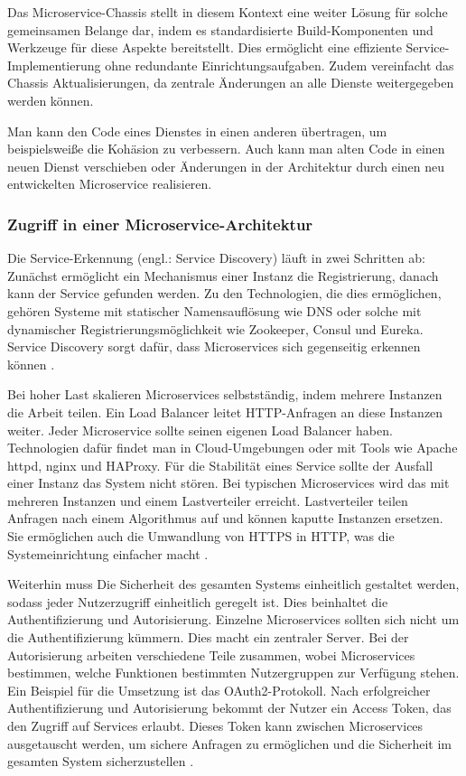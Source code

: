 {%
Das Microservice-Chassis stellt in diesem Kontext eine weiter Lösung für solche gemeinsamen Belange dar, indem es standardisierte Build-Komponenten und Werkzeuge für diese Aspekte bereitstellt. Dies ermöglicht eine effiziente Service-Implementierung ohne redundante Einrichtungsaufgaben. Zudem vereinfacht das Chassis Aktualisierungen, da zentrale Änderungen an alle Dienste weitergegeben werden können.
\cite{richardson}

Man kann den Code eines Dienstes in einen anderen übertragen, um beispielsweiße die Kohäsion zu verbessern. Auch kann man alten Code in einen neuen Dienst verschieben oder Änderungen in der Architektur durch einen neu entwickelten Microservice realisieren.
\cite[S. 115-120]{wolff}

\subsubsection{Zugriff in einer Microservice-Architektur}

Die Service-Erkennung (engl.: Service Discovery) läuft in zwei Schritten ab: Zunächst ermöglicht ein Mechanismus einer Instanz die Registrierung, danach kann der Service gefunden werden. Zu den Technologien, die dies ermöglichen, gehören Systeme mit statischer Namensauflösung wie DNS oder solche mit dynamischer Registrierungsmöglichkeit wie Zookeeper, Consul und Eureka. Service Discovery sorgt dafür, dass Microservices sich gegenseitig erkennen können \cite[S.296-301]{newman} \cite[S. 143 - 146]{wolff} \cite[S.329]{daschner}.

Bei hoher Last skalieren Microservices selbstständig, indem mehrere Instanzen die Arbeit teilen. Ein Load Balancer leitet HTTP-Anfragen an diese Instanzen weiter. Jeder Microservice sollte seinen eigenen Load Balancer haben. Technologien dafür findet man in Cloud-Umgebungen oder mit Tools wie Apache httpd, nginx und HAProxy. Für die Stabilität eines Service sollte der Ausfall einer Instanz das System nicht stören. Bei typischen Microservices wird das mit mehreren Instanzen und einem Lastverteiler erreicht. Lastverteiler teilen Anfragen nach einem Algorithmus auf und können kaputte Instanzen ersetzen. Sie ermöglichen auch die Umwandlung von HTTPS in HTTP, was die Systemeinrichtung einfacher macht \cite[S. 147 - 150]{wolff} \cite[S.274-275]{newman}.

Weiterhin muss Die Sicherheit des gesamten Systems einheitlich gestaltet werden, sodass jeder Nutzerzugriff einheitlich geregelt ist. Dies beinhaltet die Authentifizierung und Autorisierung. Einzelne Microservices sollten sich nicht um die Authentifizierung kümmern. Dies macht ein zentraler Server. Bei der Autorisierung arbeiten verschiedene Teile zusammen, wobei Microservices bestimmen, welche Funktionen bestimmten Nutzergruppen zur Verfügung stehen. Ein Beispiel für die Umsetzung ist das OAuth2-Protokoll. Nach erfolgreicher Authentifizierung und Autorisierung bekommt der Nutzer ein Access Token, das den Zugriff auf Services erlaubt. Dieses Token kann zwischen Microservices ausgetauscht werden, um sichere Anfragen zu ermöglichen und die Sicherheit im gesamten System sicherzustellen \cite[S. 153-161]{wolff}.


}

